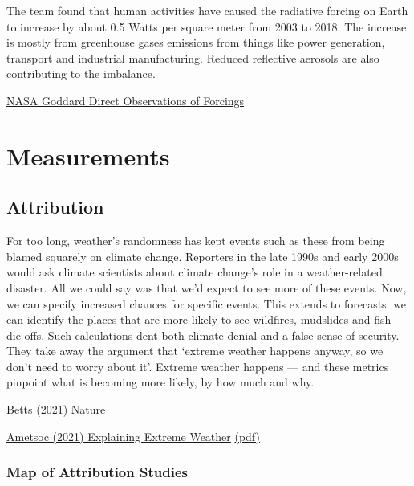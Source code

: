 \documentclass[
]{book}
\begin{document}
The team found that human activities have caused the radiative forcing on Earth to increase by about 0.5 Watts per square meter from 2003 to 2018. The increase is mostly from greenhouse gases emissions from things like power generation, transport and industrial manufacturing. Reduced reflective aerosols are also contributing to the imbalance.

\href{https://www.nasa.gov/feature/goddard/2021/direct-observations-confirm-that-humans-are-throwing-earth-s-energy-budget-off-balance}{NASA Goddard Direct Observations of Forcings}

\hypertarget{part-measurements}{%
\part{Measurements}\label{part-measurements}}

\hypertarget{attribution}{%
\chapter{Attribution}\label{attribution}}

For too long, weather's randomness has kept events such as these from being blamed squarely on climate change. Reporters in the late 1990s and early 2000s would ask climate scientists about climate change's role in a weather-related disaster. All we could say was that we'd expect to see more of these events. Now, we can specify increased chances for specific events. This extends to forecasts: we can identify the places that are more likely to see wildfires, mudslides and fish die-offs. Such calculations dent both climate denial and a false sense of security. They take away the argument that `extreme weather happens anyway, so we don't need to worry about it'. Extreme weather happens --- and these metrics pinpoint what is becoming more likely, by how much and why.

\href{https://www.nature.com/articles/d41586-021-00185-x}{Betts (2021) Nature}

\href{https://www.ametsoc.org/ams/index.cfm/publications/bulletin-of-the-american-meteorological-society-bams/explaining-extreme-events-from-a-climate-perspective/}{Ametsoc (2021) Explaining Extreme Weather}
\href{pdf/Ametsoc_2021_Explaining_Extreme_2019.pdf}{(pdf)}

\hypertarget{map-of-attribution-studies}{%
\section{Map of Attribution Studies}\label{map-of-attribution-studies}}
\end{document}
